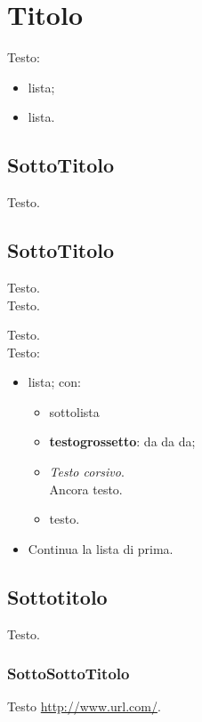 \section{Titolo}{
	Testo:
	\begin{itemize}\itemsep1pt
		\item lista;
		\item lista.
	\end{itemize} 
	
	\subsection{SottoTitolo}{
		Testo.
		
	}
	\subsection{SottoTitolo}{
		Testo.
	\\
		Testo.
		
		Testo.
		\\
		Testo:
		\begin{itemize}\itemsep1pt
			\item lista; con:
			\begin{itemize}\itemsep1pt
				\item sottolista
				\item \textbf{testogrossetto}: da da da;
				\item \textit{Testo corsivo}.\\ 
				Ancora testo.
				\item testo.
			\end{itemize}
			\item Continua la lista di prima.
		\end{itemize}
		}
	\subsection{Sottotitolo}{
		Testo.
		\subsubsection{SottoSottoTitolo}{
			Testo \url{http://www.url.com/}.
		}
	}
}
